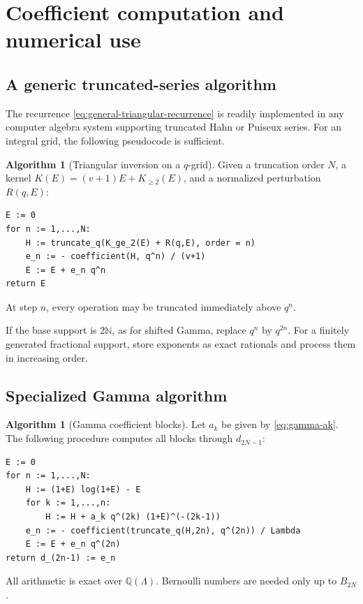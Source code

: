 \documentclass[11pt,oneside]{article}
\theoremstyle{plain}
\theoremstyle{definition}
\newtheorem{algorithm}[theorem]{Algorithm}
\theoremstyle{remark}
\newcommand{\Q}{\mathbb{Q}}
\newcommand{\N}{\mathbb{N}}
\begin{document}
\section{Coefficient computation and numerical use}
\label{sec:algorithms}

\subsection{A generic truncated-series algorithm}

The recurrence \cref{eq:general-triangular-recurrence} is readily implemented
in any computer algebra system supporting truncated Hahn or Puiseux series.
For an integral grid, the following pseudocode is sufficient.

\begin{algorithm}[Triangular inversion on a \(q\)-grid]
\label{alg:generic-triangular}
Given a truncation order \(N\), a kernel
\(K(E)=(v+1)E+K_{\ge2}(E)\), and a normalized perturbation
\(R(q,E)\):
\begin{lstlisting}
E := 0
for n := 1,...,N:
    H := truncate_q(K_ge_2(E) + R(q,E), order = n)
    e_n := - coefficient(H, q^n) / (v+1)
    E := E + e_n q^n
return E
\end{lstlisting}
At step \(n\), every operation may be truncated immediately above \(q^n\).
\end{algorithm}

If the base support is \(2\N\), as for shifted Gamma, replace \(q^n\) by
\(q^{2n}\).  For a finitely generated fractional support, store exponents as
exact rationals and process them in increasing order.

\subsection{Specialized Gamma algorithm}

\begin{algorithm}[Gamma coefficient blocks]
\label{alg:gamma}
Let \(a_k\) be given by \cref{eq:gamma-ak}.  The following
procedure computes all blocks through \(d_{2N-1}\):
\begin{lstlisting}
E := 0
for n := 1,...,N:
    H := (1+E) log(1+E) - E
    for k := 1,...,n:
        H := H + a_k q^(2k) (1+E)^(-(2k-1))
    e_n := - coefficient(truncate_q(H,2n), q^(2n)) / Lambda
    E := E + e_n q^(2n)
return d_(2n-1) := e_n
\end{lstlisting}
All arithmetic is exact over \(\Q(\Lambda)\).  Bernoulli numbers are needed
only up to \(B_{2N}\).
\end{algorithm}
\end{document}
